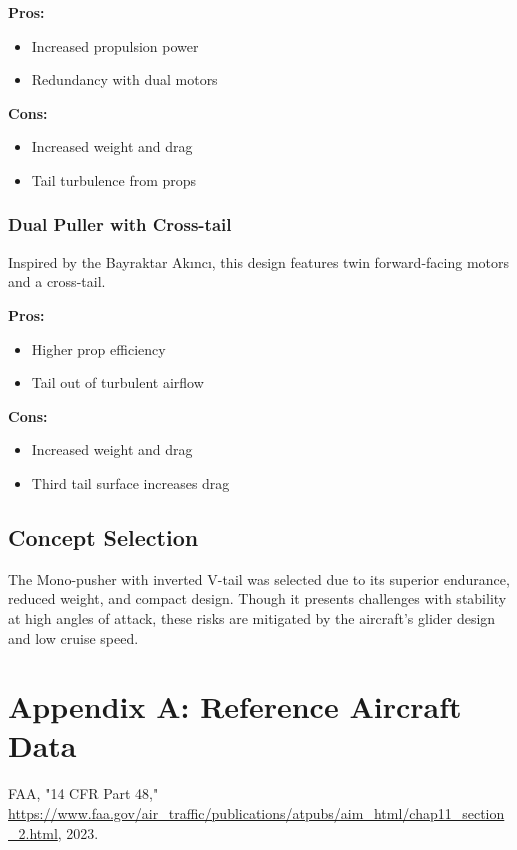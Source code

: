 \documentclass[12pt]{article}
\begin{document}
	\textbf{Pros:}
	\begin{itemize}
		\item Increased propulsion power
		\item Redundancy with dual motors
	\end{itemize}
	
	\textbf{Cons:}
	\begin{itemize}
		\item Increased weight and drag
		\item Tail turbulence from props
	\end{itemize}
	
	\subsubsection{Dual Puller with Cross-tail}
	Inspired by the Bayraktar Akıncı, this design features twin forward-facing motors and a cross-tail.
	
	\textbf{Pros:}
	\begin{itemize}
		\item Higher prop efficiency
		\item Tail out of turbulent airflow
	\end{itemize}
	
	\textbf{Cons:}
	\begin{itemize}
		\item Increased weight and drag
		\item Third tail surface increases drag
	\end{itemize}
	
	\subsection{Concept Selection}
	The Mono-pusher with inverted V-tail was selected due to its superior endurance, reduced weight, and compact design. Though it presents challenges with stability at high angles of attack, these risks are mitigated by the aircraft's glider design and low cruise speed.
	
	\newpage
	
	\appendix
	\section{Appendix A: Reference Aircraft Data}
	
	
	\newpage
	
	\begin{thebibliography}{9}
		FAA, "14 CFR Part 48," \url{https://www.faa.gov/air_traffic/publications/atpubs/aim_html/chap11_section_2.html}, 2023.
	\end{thebibliography}
	
\end{document}
